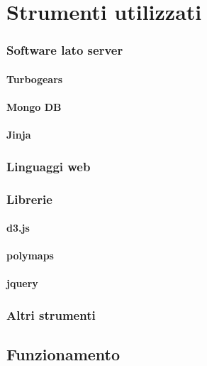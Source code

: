 \chapter{Strumenti utilizzati}
		\subsection{Software lato server}%
			\subsubsection{Turbogears}
			\subsubsection{Mongo DB}
			\subsubsection{Jinja}%
		\subsection{Linguaggi web}
		\subsection{Librerie}
			\subsubsection{d3.js}
			\subsubsection{polymaps}
			\subsubsection{jquery}
		\subsection{Altri strumenti}
			
	\section{Funzionamento}%
